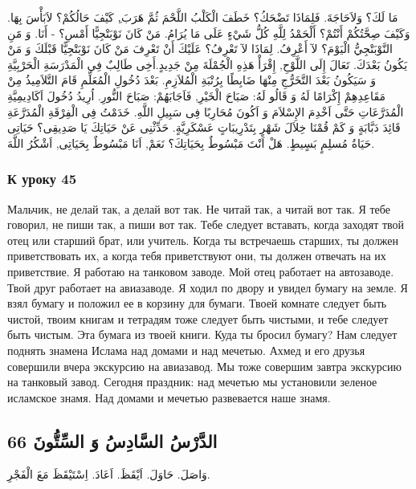\documentclass[a5paper]{article}
\begin{document}
مَا لَكَ؟ وَلاَحَاجَةَ. فَلِمَاذَا تَضْحَكُ؟ خَطَفَ الْكَلْبُ اللَّحْمَ ثُمَّ هَرَبَ.ِ كَيْفَ حَالُكُمْ؟ لاَبَأْسَ بِهَا. وَكَيْفَ صِحَّتُكُمْ أَنْتُمْ؟ أَلْحَمْدُ لِلَّهِ كُلُّ شَيْءٍ عَلَى مَا يُرَامُ. مَنْ كَانَ نَوْبَتْجِيًّا أَمْسِ؟ - أَنَا. وَ مََنِ النَّوْبَتْجِيُّ الْيَوْمَ؟ لآ أَعْرِفُ. لِمَاذَا لآ تَعْرِفُ؟ عَلَيْكَ أَنْ تَعْرِفَ مَنْ كَانَ نَوْبَتْجِيًّا قَبْلَكَ وَ مَنْ يَكُونُ بَعْدَكَ. تَعَالَ إِلَى اللَّوْحِ, إِقْرَأْ هَذِهِ الْجُمْلَةَ مِنْ جَدِيدٍ.أَخِى طَالِبٌ فِى الْمَدْرَسَةِ الْحَرْبِيَّةِ وَ سَيَكُونُ بَعْدَ التَّخَرُّجِ مِنْهَا ضَابِطًا بِرُتْبَةِ الْمُلاَزِمِ. بَعْدَ دُخُولِ الْمُعَلِّمِ قَامَ التَّلاَمِيذُ مِنْ مَقَاعِدِهِمْ إِكْرَامًا لَهُ وَ قَالُو لَهُ: صَبَاحَ الْخَيْرِ, فَاَجَابَهُمْ: صَبَاحَ النُّورِ. اُرِيدُ دُخُولَ اَكَادِيمِيَّةِ الْمُدَرَّعَاتِ حَتَّى اَخْدِمَ الإِسْلاَمَ وَ اَكُونَ مُحَارِبًا فِى سَبِيلِ اللَّهِ. خَدَمْتُ فِى الْفِرْقَةِ الْمُدَرَّعَةِ قَائِدَ دَبَّابَةٍ وَ كَمْ قُمْنَا خِلاَلَ شَهْرٍ بِتَدْرِيبَاتٍ عَسْكَرِيَّةٍ. حَدِّثْنِى عَنْ حَيَاتِكَ يَا صَدِيقِى؟ حَيَاتِى حَيَاةُ مُسلِمٍ بَسٍيطٍ. هَلْ اَنْتَ مَبْسُوطٌ بِحَيَاتِكَ؟ نَعَمْ, اَنَا مَبْسُوطٌ بِحَيَاتِى, اَشْكُرُ اللَّهَ.

\subsubsection{К уроку 45}
Мальчик, не делай так, а делай вот так. Не читай так, а читай вот так. Я тебе говорил, не пиши так, а пиши вот так. Тебе следует вставать, когда заходят твой отец или старший брат, или учитель. Когда ты встречаешь старших, ты должен приветствовать их, а когда тебя приветствуют они, ты должен отвечать на их приветствие. Я работаю на танковом заводе. Мой отец работает на автозаводе. Твой друг работает на авиазаводе. Я ходил по двору и увидел бумагу на земле. Я взял бумагу и положил ее в корзину для бумаги. Твоей комнате следует быть чистой, твоим книгам и тетрадям тоже следует быть чистыми, и тебе следует быть чистым. Эта бумага из твоей книги. Куда ты бросил бумагу? Нам следует поднять знамена Ислама над домами и над мечетью. Ахмед и его друзья совершили вчера экскурсию на авиазавод. Мы тоже совершим завтра экскурсию на танковый завод. Сегодня праздник: над мечетью мы установили зеленое исламское знамя. Над домами и мечетью развевается наше знамя.

\subsection{الدَّرْسُ السَّادِسُ وَ السِّتُّونَ 66}
وَاصَلَ. حَاوَلَ. اَيْقَظَ. اَعَادَ. اِسْتَيْقَظَ مَعَ الْفَجْرِ.
\end{document}
